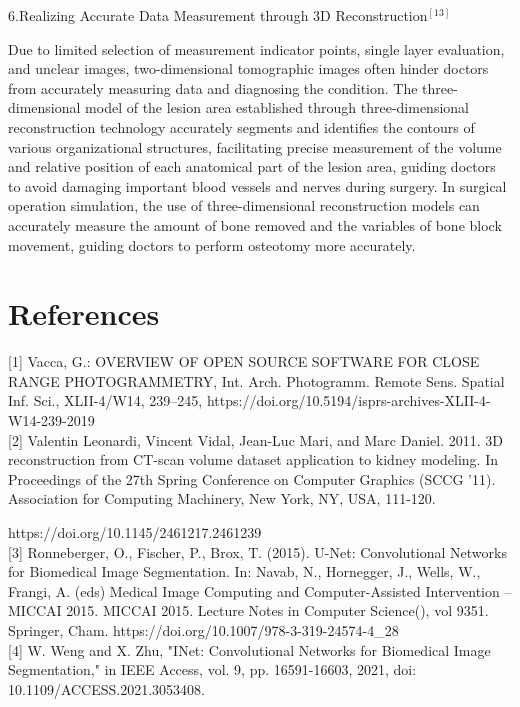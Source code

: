 \documentclass[12pt,a4paper]{report}
\begin{document}
6.Realizing Accurate Data Measurement through 3D Reconstruction$^{[13]}$

\qquad Due to limited selection of measurement indicator points, single layer evaluation, and unclear images, two-dimensional tomographic images often hinder doctors from accurately measuring data and diagnosing the condition.
The three-dimensional model of the lesion area established through three-dimensional reconstruction technology accurately segments and identifies the contours of various organizational structures, facilitating precise measurement of
the volume and relative position of each anatomical part of the lesion area, guiding doctors to avoid damaging important blood vessels and nerves during surgery. In surgical operation simulation, the use of three-dimensional reconstruction
models can accurately measure the amount of bone removed and the variables of bone block movement, guiding doctors to perform osteotomy more accurately.

\section{References}

 [1] Vacca, G.: OVERVIEW OF OPEN SOURCE SOFTWARE FOR CLOSE RANGE PHOTOGRAMMETRY, Int. Arch. Photogramm. Remote Sens. Spatial Inf. Sci., XLII-4/W14, 239–245, https://doi.org/10.5194/isprs-archives-XLII-4-W14-239-2019\\

[2] Valentin Leonardi, Vincent Vidal, Jean-Luc Mari, and Marc Daniel. 2011. 3D reconstruction from CT-scan volume dataset application to kidney modeling. In Proceedings of the 27th Spring Conference on Computer Graphics (SCCG '11). Association for Computing Machinery, New York, NY, USA, 111-120.

https://doi.org/10.1145/2461217.2461239\\

[3] Ronneberger, O., Fischer, P., Brox, T. (2015). U-Net: Convolutional Networks for Biomedical Image Segmentation. In: Navab, N., Hornegger, J., Wells, W., Frangi, A. (eds) Medical Image Computing and Computer-Assisted Intervention – MICCAI 2015. MICCAI 2015. Lecture Notes in Computer Science(), vol 9351. Springer, Cham. https://doi.org/10.1007/978-3-319-24574-4\_28\\

[4] W. Weng and X. Zhu, "INet: Convolutional Networks for Biomedical Image Segmentation," in IEEE Access, vol. 9, pp. 16591-16603, 2021, doi: 10.1109/ACCESS.2021.3053408.\\
\end{document}
